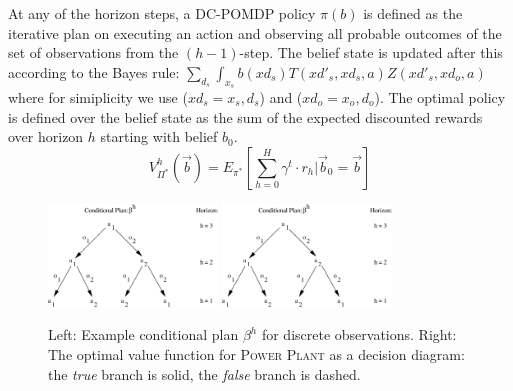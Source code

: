 \documentclass{article} %
\begin{document}
 At any of the horizon steps, a DC-POMDP policy $\pi(b)$ is defined as the iterative plan on executing an action and observing all probable outcomes of the set of observations from the $(h-1)$-step. The belief state is updated after this according to the Bayes rule: $\sum_{d_s}\int_{x_s} b(xd_s)T(xd'_s,xd_s,a)Z(xd'_s,xd_o,a)$  where for simiplicity we use ($xd_s = x_s,d_s$) and ($xd_o=x_o,d_o$).
The optimal policy is defined over the belief state as the sum of the expected discounted rewards over horizon $h$ starting with belief $b_0$.
\begin{equation}
V^h_{\Pi^*}(\vec{b}) = E_{\pi^*} \left[ \sum_{h=0}^{H} \gamma^t \cdot r_h \Big| \vec{b}_0 = \vec{b} \right]\nonumber
\end{equation}
\begin{figure}[t!]
\begin{center}
\includegraphics[width=0.4\textwidth]{pics/cond_plan2.pdf}
\includegraphics[width=0.4\textwidth]{pics/cond_plan2.pdf}
\end{center}
\vspace{-2mm}
\caption{\footnotesize Left: Example conditional plan $\beta^h$ for discrete observations. Right: The optimal value function for \textsc{Power Plant}
as a decision diagram: 
the \emph{true} branch is solid, the \emph{false}
branch is dashed.}
\label{fig:cond_plan}
\vspace{-1mm}
\end{figure}
\end{document}
